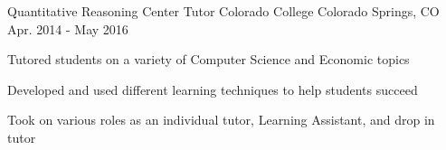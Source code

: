 \begin{cventries}


\vspace{-1.5em}
\cventry
{Quantitative Reasoning Center Tutor} %
{Colorado College} %
{Colorado Springs, CO} %
{Apr. 2014 - May 2016} %
{ %
\begin{cvitems}
\item{Tutored students on a variety of Computer Science and Economic topics}
\item{Developed and used different learning techniques to help students succeed}
\item{Took on various roles as an individual tutor, Learning Assistant, and drop in tutor}
\end{cvitems}
}



\end{cventries}
